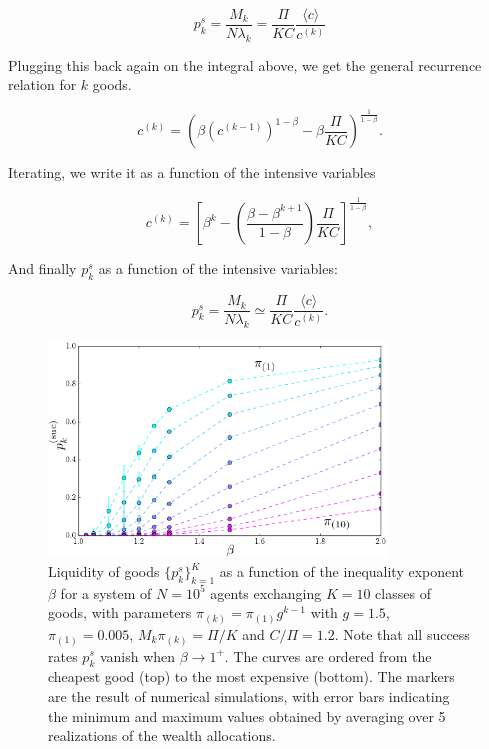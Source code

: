 \begin{equation}
p_k^s = \frac{M_k}{N \lambda_k} = \frac{\Pi}{K C} \frac{\langle c \rangle}{c^{(k)}}
\end{equation}

Plugging this back again on the integral above, we get the general recurrence relation for $k$ goods.

\begin{equation}
c^{(k)} = \left(\beta \left( c^{(k-1)} \right)^{1-\beta} - \beta \frac{\Pi}{K C} \right)^{\frac{1}{1-\beta}}.
\end{equation}

Iterating, we write it as a function of the intensive variables 

\begin{equation}
c^{(k)} = \left[ \beta^k  - \left( \frac{\beta - \beta^{k+1}}{1-\beta} \right) \frac{\Pi}{K C} \right] ^{\frac{1}{1-\beta}},
\label{Eq:ps_and_ck_generalCaseAnyMathcalM1}
\end{equation}
 
And finally $p^s_k$ as a function of the intensive variables:

\begin{equation}
p_k^s = \frac{M_k}{N \lambda_k} \simeq \frac{\Pi}{K C} \frac{\langle c \rangle}{c^{(k)}}.
 \label{Eq:ps_and_ck_generalCaseAnyMathcalM2}
\end{equation}


\begin{figure}
\centering
\includegraphics[width=0.8\textwidth]{figs_ineq/cropping-K=10_e=1p2_g=1p5_ps_prediction_adjustedcapital-crop.pdf}
\caption{Liquidity of goods $\{p^s_k\}_{k=1}^K$  as a function of the inequality exponent $\beta$ for a system of $N=10^5$ agents exchanging $K=10$ classes of goods, with parameters $\pi_{(k)}=\pi_{(1)}g^{k-1}$ with $g=1.5$, $\pi_{(1)}=0.005$, $M_k\pi_{(k)}=\Pi/K$ and $C/\Pi=1.2$. Note that all success rates $p^s_k$ vanish when $\beta \to 1^+$.  The curves are ordered from the cheapest good (top) to the most expensive (bottom). The markers are the result of numerical simulations, with error bars indicating the minimum and maximum values obtained by averaging over 5 realizations of the wealth allocations.}
\label{Fig:K10_ps_beta}
\end{figure}

